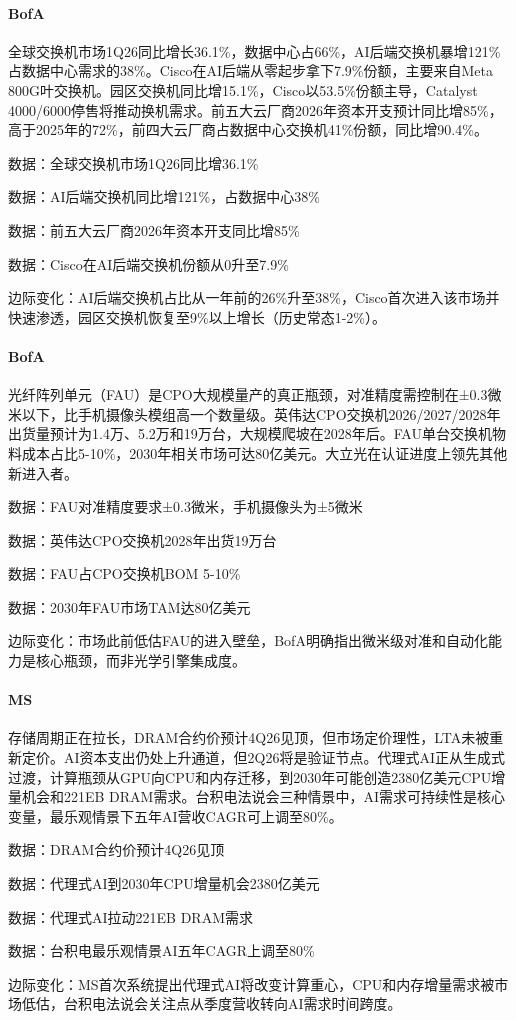 \documentclass[11pt]{ctexart}
\begin{document}
\paragraph{BofA} 全球交换机市场1Q26同比增长36.1\%，数据中心占66\%，AI后端交换机暴增121\%占数据中心需求的38\%。Cisco在AI后端从零起步拿下7.9\%份额，主要来自Meta 800G叶交换机。园区交换机同比增15.1\%，Cisco以53.5\%份额主导，Catalyst 4000/6000停售将推动换机需求。前五大云厂商2026年资本开支预计同比增85\%，高于2025年的72\%，前四大云厂商占数据中心交换机41\%份额，同比增90.4\%。
{\small\color{refgray}数据：全球交换机市场1Q26同比增36.1\%\par}
{\small\color{refgray}数据：AI后端交换机同比增121\%，占数据中心38\%\par}
{\small\color{refgray}数据：前五大云厂商2026年资本开支同比增85\%\par}
{\small\color{refgray}数据：Cisco在AI后端交换机份额从0升至7.9\%\par}
{\small\color{refgray}边际变化：AI后端交换机占比从一年前的26\%升至38\%，Cisco首次进入该市场并快速渗透，园区交换机恢复至9\%以上增长（历史常态1-2\%）。\par}
\paragraph{BofA} 光纤阵列单元（FAU）是CPO大规模量产的真正瓶颈，对准精度需控制在±0.3微米以下，比手机摄像头模组高一个数量级。英伟达CPO交换机2026/2027/2028年出货量预计为1.4万、5.2万和19万台，大规模爬坡在2028年后。FAU单台交换机物料成本占比5-10\%，2030年相关市场可达80亿美元。大立光在认证进度上领先其他新进入者。
{\small\color{refgray}数据：FAU对准精度要求±0.3微米，手机摄像头为±5微米\par}
{\small\color{refgray}数据：英伟达CPO交换机2028年出货19万台\par}
{\small\color{refgray}数据：FAU占CPO交换机BOM 5-10\%\par}
{\small\color{refgray}数据：2030年FAU市场TAM达80亿美元\par}
{\small\color{refgray}边际变化：市场此前低估FAU的进入壁垒，BofA明确指出微米级对准和自动化能力是核心瓶颈，而非光学引擎集成度。\par}
\paragraph{MS} 存储周期正在拉长，DRAM合约价预计4Q26见顶，但市场定价理性，LTA未被重新定价。AI资本支出仍处上升通道，但2Q26将是验证节点。代理式AI正从生成式过渡，计算瓶颈从GPU向CPU和内存迁移，到2030年可能创造2380亿美元CPU增量机会和221EB DRAM需求。台积电法说会三种情景中，AI需求可持续性是核心变量，最乐观情景下五年AI营收CAGR可上调至80\%。
{\small\color{refgray}数据：DRAM合约价预计4Q26见顶\par}
{\small\color{refgray}数据：代理式AI到2030年CPU增量机会2380亿美元\par}
{\small\color{refgray}数据：代理式AI拉动221EB DRAM需求\par}
{\small\color{refgray}数据：台积电最乐观情景AI五年CAGR上调至80\%\par}
{\small\color{refgray}边际变化：MS首次系统提出代理式AI将改变计算重心，CPU和内存增量需求被市场低估，台积电法说会关注点从季度营收转向AI需求时间跨度。\par}
\end{document}
